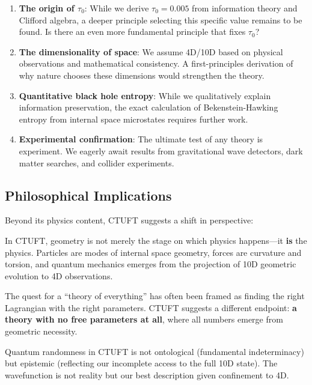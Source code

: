 \begin{enumerate}
    \item \textbf{The origin of $\tau_0$}: While we derive $\tau_0 = 0.005$ from information theory and Clifford algebra, a deeper principle selecting this specific value remains to be found. Is there an even more fundamental principle that fixes $\tau_0$?
    
    \item \textbf{The dimensionality of space}: We assume 4D/10D based on physical observations and mathematical consistency. A first-principles derivation of why nature chooses these dimensions would strengthen the theory.
    
    \item \textbf{Quantitative black hole entropy}: While we qualitatively explain information preservation, the exact calculation of Bekenstein-Hawking entropy from internal space microstates requires further work.
    
    \item \textbf{Experimental confirmation}: The ultimate test of any theory is experiment. We eagerly await results from gravitational wave detectors, dark matter searches, and collider experiments.
\end{enumerate}

\subsection{Philosophical Implications}

Beyond its physics content, CTUFT suggests a shift in perspective:

\begin{insight}
In CTUFT, geometry is not merely the stage on which physics happens—it \textbf{is} the physics. Particles are modes of internal space geometry, forces are curvature and torsion, and quantum mechanics emerges from the projection of 10D geometric evolution to 4D observations.
\end{insight}

\begin{insight}
The quest for a ``theory of everything'' has often been framed as finding the right Lagrangian with the right parameters. CTUFT suggests a different endpoint: \textbf{a theory with no free parameters at all}, where all numbers emerge from geometric necessity.
\end{insight}

\begin{insight}
Quantum randomness in CTUFT is not ontological (fundamental indeterminacy) but epistemic (reflecting our incomplete access to the full 10D state). The wavefunction is not reality but our best description given confinement to 4D.
\end{insight}

